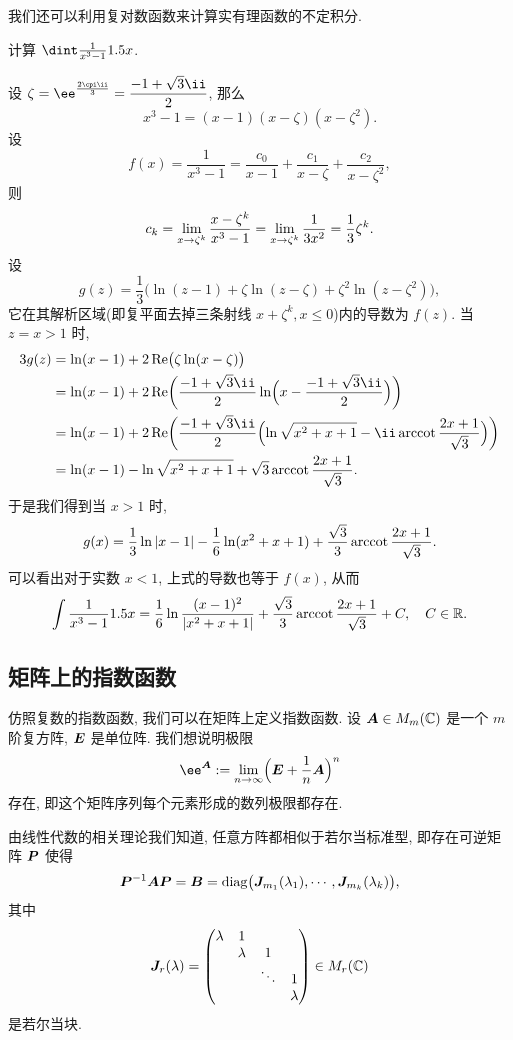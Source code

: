 我们还可以利用复对数函数来计算实有理函数的不定积分.

\begin{example}
  \label{exam:int-rational-function}
  计算 $\dint \frac1{x^3-1}\d x$.
\end{example}
  
\begin{solution}
  设 $\zeta=\ee^{\frac{2\cpi\ii}3}=\dfrac{-1+\sqrt3\ii}2$, 那么
  \[
    x^3-1=(x-1)(x-\zeta)(x-\zeta^2).
  \]
  设
  \[
     f(x)
    =\frac1{x^3-1}
    =\frac{c_0}{x-1}+\frac{c_1}{x-\zeta}+\frac{c_2}{x-\zeta^2},
  \]
  则
  \[
     c_k
    =\lim_{x\rightarrow \zeta^k} \frac{x-\zeta^k}{x^3-1}
    =\lim_{x\rightarrow \zeta^k} \frac1{3x^2}
    =\frac13\zeta^k.
  \]
  设
  \[
    g(z)=\frac13\bigl(
      \ln(z-1)+\zeta\ln(z-\zeta)+\zeta^2\ln(z-\zeta^2)
    \bigr),
  \]
  它在其解析区域(即复平面去掉三条射线 $x+\zeta^k,x\le 0$)内的导数为 $f(z)$.
  当 $z=x>1$ 时, 
  \begin{align*}
    3g(z)&
    =\ln(x-1)+2\Re\bigl(\zeta\ln(x-\zeta)\bigr)\\&
    =\ln(x-1)+2\Re\biggl(\frac{-1+\sqrt3\ii}2\ln\Bigl(x-\frac{-1+\sqrt3\ii}2\Bigr)\biggr)\\&
    =\ln(x-1)+2\Re\biggl(
      \frac{-1+\sqrt3\ii}2
        \Bigl(\ln\sqrt{x^2+x+1}-\ii\arccot\frac{2x+1}{\sqrt3}\Bigr)
      \biggr)\\&
    =\ln(x-1)-\ln\sqrt{x^2+x+1}+\sqrt 3\arccot\frac{2x+1}{\sqrt3}.
  \end{align*}
  于是我们得到当 $x>1$ 时,
  \[
    g(x)=\frac13\ln\left|x-1\right|-\frac16\ln(x^2+x+1)
      +\frac{\sqrt3}3\operatorname{arccot}\frac{2x+1}{\sqrt3}.
  \]
  可以看出对于实数 $x<1$, 上式的导数也等于 $f(x)$, 从而
  \[
    \int\frac1{x^3-1}1.5 x
    =\frac16\ln\frac{(x-1)^2}{|x^2+x+1|}
      +\frac{\sqrt3}3\operatorname{arccot}\frac{2x+1}{\sqrt3}+C,
      \quad C\in{\mathbb{R}}.
  \]
\end{solution}



\subsection{矩阵上的指数函数\optional}

仿照复数的指数函数, 我们可以在矩阵上定义指数函数.
设 ${\boldsymbol{A}}\in M_m({\mathbb{C}})$ 是一个 $m$ 阶复方阵, ${\boldsymbol{E}}$ 是单位阵.
我们想说明极限
\[
  \ee^\bfA:=\lim_{n\ra \infty}\Bigl(\bfE+\frac1n \bfA\Bigr)^n
\]
存在, 即这个矩阵序列每个元素形成的数列极限都存在.

由线性代数的相关理论我们知道, 任意方阵都相似于若尔当标准型, 即存在可逆矩阵 ${\boldsymbol{P}}$ 使得
\[
   {\boldsymbol{P}}^{-1}{\boldsymbol{A}}{\boldsymbol{P}}
  ={\boldsymbol{B}}
  ={\mathrm{diag}}\bigl({\boldsymbol{J}}_{m_1}(\lambda_1),\cdots,{\boldsymbol{J}}_{m_k}(\lambda_k)\bigr),
\]
其中
\[
  {\boldsymbol{J}}_r(\lambda)=\begin{pmatrix}
    \lambda&1&   &\\
    &\lambda& 1 &\\
    & &\ddots&1\\
    & &      &\lambda
  \end{pmatrix}\in M_r({\mathbb{C}})
\]
是若尔当块.

